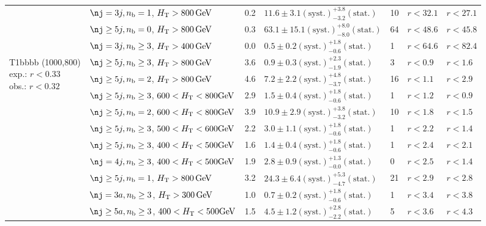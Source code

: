\begin{table}[h!]
\begin{tabular}{ lllllll }
 & $\nj =3j,\nb =1$, $H_{\mathrm{T}} > 800 \, \mathrm{GeV}$ & 0.2 & $11.6 \pm 3.1 \mathrm{(syst.)} ^{+3.8}_{-3.2} \mathrm{(stat.)}$ & 10 & $r < 32.1$ & $r < 27.1$\\ 
 & $\nj \geq5j,\nb =0$, $H_{\mathrm{T}} > 800 \, \mathrm{GeV}$ & 0.3 & $63.1 \pm 15.1 \mathrm{(syst.)} ^{+8.0}_{-8.0} \mathrm{(stat.)}$ & 64 & $r < 48.6$ & $r < 45.8$\\ 
 & $\nj =3j,\nb \geq3$, $H_{\mathrm{T}} > 400 \, \mathrm{GeV}$ & 0.0 & $0.5 \pm 0.2 \mathrm{(syst.)} ^{+1.8}_{-0.6} \mathrm{(stat.)}$ & 1 & $r < 64.6$ & $r < 82.4$\\ \hline
\multirow{10}{*}{\parbox[t]{2cm}{T1bbbb (1000,800)\\exp.: $r<0.33$\\obs.: $r<0.32$}}
 & $\nj \geq5j,\nb \geq3$, $H_{\mathrm{T}} > 800 \, \mathrm{GeV}$ & 3.6 & $0.9 \pm 0.3 \mathrm{(syst.)} ^{+2.3}_{-1.9} \mathrm{(stat.)}$ & 3 & $r < 0.9$ & $r < 1.6$\\ 
 & $\nj \geq5j,\nb =2$, $H_{\mathrm{T}} > 800 \, \mathrm{GeV}$ & 4.6 & $7.2 \pm 2.2 \mathrm{(syst.)} ^{+4.8}_{-3.7} \mathrm{(stat.)}$ & 16 & $r < 1.1$ & $r < 2.9$\\ 
 & $\nj \geq5j,\nb \geq3$, $600 < H_{\mathrm{T}} < 800 \mathrm{GeV}$ & 2.9 & $1.5 \pm 0.4 \mathrm{(syst.)} ^{+1.8}_{-0.6} \mathrm{(stat.)}$ & 1 & $r < 1.2$ & $r < 0.9$\\ 
 & $\nj \geq5j,\nb =2$, $600 < H_{\mathrm{T}} < 800 \mathrm{GeV}$ & 3.9 & $10.9 \pm 2.9 \mathrm{(syst.)} ^{+3.8}_{-3.2} \mathrm{(stat.)}$ & 10 & $r < 1.8$ & $r < 1.5$\\ 
 & $\nj \geq5j,\nb \geq3$, $500 < H_{\mathrm{T}} < 600 \mathrm{GeV}$ & 2.2 & $3.0 \pm 1.1 \mathrm{(syst.)} ^{+1.8}_{-0.6} \mathrm{(stat.)}$ & 1 & $r < 2.2$ & $r < 1.4$\\ 
 & $\nj \geq5j,\nb \geq3$, $400 < H_{\mathrm{T}} < 500 \mathrm{GeV}$ & 1.6 & $1.4 \pm 0.4 \mathrm{(syst.)} ^{+1.8}_{-0.6} \mathrm{(stat.)}$ & 1 & $r < 2.4$ & $r < 2.1$\\ 
 & $\nj =4j,\nb \geq3$, $400 < H_{\mathrm{T}} < 500 \mathrm{GeV}$ & 1.9 & $2.8 \pm 0.9 \mathrm{(syst.)} ^{+1.3}_{-0.0} \mathrm{(stat.)}$ & 0 & $r < 2.5$ & $r < 1.4$\\ 
 & $\nj \geq5j,\nb =1$, $H_{\mathrm{T}} > 800 \, \mathrm{GeV}$ & 3.2 & $24.3 \pm 6.4 \mathrm{(syst.)} ^{+5.3}_{-4.7} \mathrm{(stat.)}$ & 21 & $r < 2.9$ & $r < 2.8$\\ 
 & $\nj =3a,\nb \geq3$, $H_{\mathrm{T}} > 300 \, \mathrm{GeV}$ & 1.0 & $0.7 \pm 0.2 \mathrm{(syst.)} ^{+1.8}_{-0.6} \mathrm{(stat.)}$ & 1 & $r < 3.4$ & $r < 3.8$\\ 
 & $\nj \geq5a,\nb \geq3$, $400 < H_{\mathrm{T}} < 500 \mathrm{GeV}$ & 1.5 & $4.5 \pm 1.2 \mathrm{(syst.)} ^{+2.8}_{-2.2} \mathrm{(stat.)}$ & 5 & $r < 3.6$ & $r < 4.3$\\ \hline
    \hline
  \end{tabular}
\end{table}



